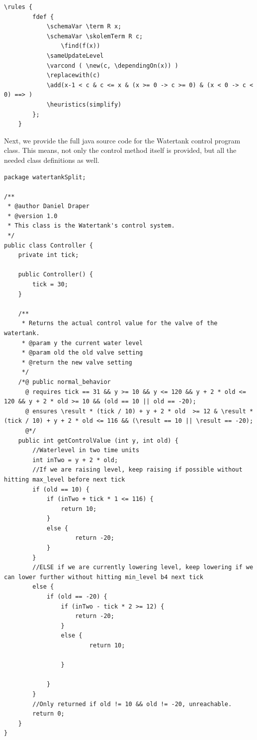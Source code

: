 \begin{lstlisting}[label=app:lst:ruleF]
	\rules {
 	 	fdef {
			\schemaVar \term R x;
			\schemaVar \skolemTerm R c;
    			\find(f(x))
			\sameUpdateLevel
			\varcond ( \new(c, \dependingOn(x)) )
			\replacewith(c)
			\add(x-1 < c & c <= x & (x >= 0 -> c >= 0) & (x < 0 -> c < 0) ==> )
			\heuristics(simplify)
		};
	}	
\end{lstlisting}

Next, we provide the full java source code for the Watertank control program class. This means, not only the control method itself is provided, but all the needed class definitions as well.

\begin{lstlisting}[label=app:lst:watertankContr]
package watertankSplit;

/**
 * @author Daniel Draper
 * @version 1.0
 * This class is the Watertank's control system.
 */
public class Controller {
	private int tick;
	
	public Controller() {
		tick = 30;
	}
	
	/**
	 * Returns the actual control value for the valve of the watertank.
	 * @param y the current water level
	 * @param old the old valve setting
	 * @return the new valve setting
	 */
	/*@ public normal_behavior
	  @ requires tick == 31 && y >= 10 && y <= 120 && y + 2 * old <= 120 && y + 2 * old >= 10 && (old == 10 || old == -20);
	  @ ensures \result * (tick / 10) + y + 2 * old  >= 12 & \result * (tick / 10) + y + 2 * old <= 116 && (\result == 10 || \result == -20);
	  @*/
	public int getControlValue (int y, int old) {
		//Waterlevel in two time units
		int inTwo = y + 2 * old;
		//If we are raising level, keep raising if possible without hitting max_level before next tick
		if (old == 10) {
			if (inTwo + tick * 1 <= 116) {
				return 10;
			}
			else {
					return -20;
			}
		}
		//ELSE if we are currently lowering level, keep lowering if we can lower further without hitting min_level b4 next tick
		else {
			if (old == -20) {
				if (inTwo - tick * 2 >= 12) {
					return -20;
				}
				else {
						return 10;
				
				}
		
			}
		}
		//Only returned if old != 10 && old != -20, unreachable.
		return 0;
	}
}
\end{lstlisting}
